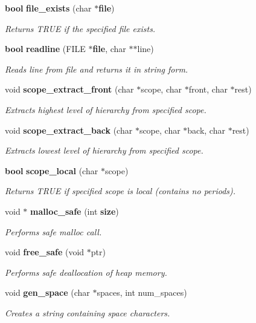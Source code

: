\begin{CompactItemize}
{\bf bool} {\bf file\_\-exists} (char $\ast${\bf file})
\begin{CompactList}\small\item\em Returns TRUE if the specified file exists.\item\end{CompactList}\item 
{\bf bool} {\bf readline} (FILE $\ast${\bf file}, char $\ast$$\ast$line)
\begin{CompactList}\small\item\em Reads line from file and returns it in string form.\item\end{CompactList}\item 
void {\bf scope\_\-extract\_\-front} (char $\ast$scope, char $\ast$front, char $\ast$rest)
\begin{CompactList}\small\item\em Extracts highest level of hierarchy from specified scope.\item\end{CompactList}\item 
void {\bf scope\_\-extract\_\-back} (char $\ast$scope, char $\ast$back, char $\ast$rest)
\begin{CompactList}\small\item\em Extracts lowest level of hierarchy from specified scope.\item\end{CompactList}\item 
{\bf bool} {\bf scope\_\-local} (char $\ast$scope)
\begin{CompactList}\small\item\em Returns TRUE if specified scope is local (contains no periods).\item\end{CompactList}\item 
void $\ast$ {\bf malloc\_\-safe} (int {\bf size})
\begin{CompactList}\small\item\em Performs safe malloc call.\item\end{CompactList}\item 
void {\bf free\_\-safe} (void $\ast$ptr)
\begin{CompactList}\small\item\em Performs safe deallocation of heap memory.\item\end{CompactList}\item 
void {\bf gen\_\-space} (char $\ast$spaces, int num\_\-spaces)
\begin{CompactList}\small\item\em Creates a string containing space characters.\item\end{CompactList}\end{CompactItemize}
